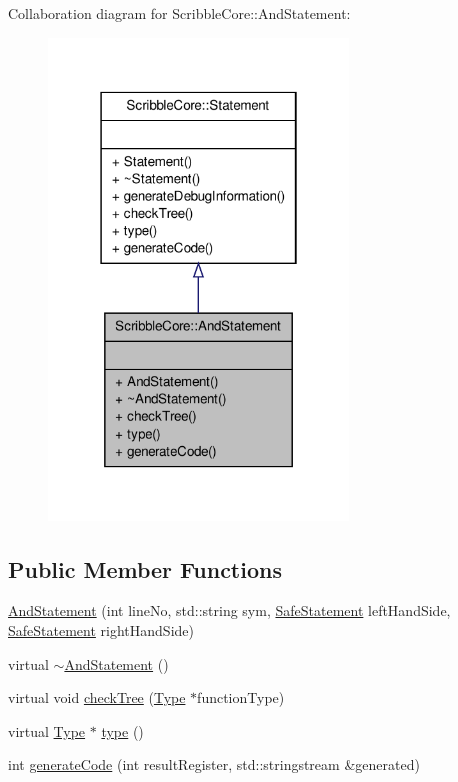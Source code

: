 Collaboration diagram for Scribble\-Core\-:\-:And\-Statement\-:
\nopagebreak
\begin{figure}[H]
\begin{center}
\leavevmode
\includegraphics[width=226pt]{class_scribble_core_1_1_and_statement__coll__graph}
\end{center}
\end{figure}
\subsection*{Public Member Functions}
\begin{DoxyCompactItemize}
\item 
\hyperlink{class_scribble_core_1_1_and_statement_a46efe1fa7d7668c486ef12269f9e40bc}{And\-Statement} (int line\-No, std\-::string sym, \hyperlink{namespace_scribble_core_a2ad5bf236bc9164cb56f564685f15a11}{Safe\-Statement} left\-Hand\-Side, \hyperlink{namespace_scribble_core_a2ad5bf236bc9164cb56f564685f15a11}{Safe\-Statement} right\-Hand\-Side)
\item 
virtual \hyperlink{class_scribble_core_1_1_and_statement_a491c2d0fef506f2001a669d4b900c133}{$\sim$\-And\-Statement} ()
\item 
virtual void \hyperlink{class_scribble_core_1_1_and_statement_a1c5599274c07acc22593b5d46ce13067}{check\-Tree} (\hyperlink{class_scribble_core_1_1_type}{Type} $\ast$function\-Type)
\item 
virtual \hyperlink{class_scribble_core_1_1_type}{Type} $\ast$ \hyperlink{class_scribble_core_1_1_and_statement_a957b93b036c51ac746c18ad7fbfcda71}{type} ()
\item 
int \hyperlink{class_scribble_core_1_1_and_statement_a314da1cf611fd6ae02f126e12a80307d}{generate\-Code} (int result\-Register, std\-::stringstream \&generated)
\end{DoxyCompactItemize}


